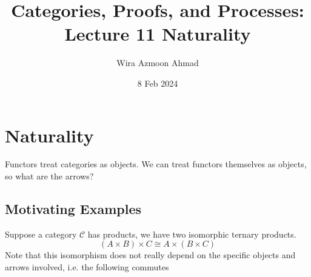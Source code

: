 \documentclass[11pt]{article} %
\title{Categories, Proofs, and Processes: \\Lecture 11 Naturality}
\author{Wira Azmoon Ahmad}
\date{8 Feb 2024}
\theoremstyle{definition}
\theoremstyle{definition}
\theoremstyle{definition}
\begin{document}
%
\maketitle






\addtocounter{section}{3}
\section{Naturality}
Functors treat categories as objects. We can treat functors themselves as objects, so what are the arrows?

\subsection{Motivating Examples}
Suppose a category $\mathcal{C}$ has products, we have two isomorphic ternary products.
\[(A\times B)\times C \cong A\times (B\times C)\]
Note that this isomorphism does not really depend on the specific objects and arrows involved,
i.e. the following commutes
\end{document}
